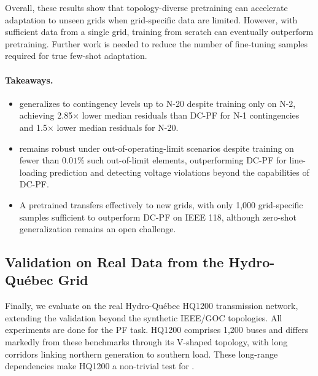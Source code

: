 Overall, these results show that topology-diverse pretraining can accelerate adaptation to unseen grids when grid-specific data are limited. However, with sufficient data from a single grid, training from scratch can eventually outperform pretraining. Further work is needed to reduce the number of fine-tuning samples required for true few-shot adaptation.\\




\begin{boxH}
\paragraph{Takeaways.}

\begin{itemize}

\item \genco generalizes to contingency levels up to N-20 despite training only on N-2, achieving 2.85$\times$ lower median residuals than DC-PF for N-1 contingencies and 1.5$\times$ lower median residuals for N-20.

\item \genco remains robust under out-of-operating-limit scenarios despite training on fewer than $0.01$\% such out-of-limit elements, outperforming DC-PF for line-loading prediction and detecting voltage violations beyond the capabilities of DC-PF.

\item A pretrained \genco transfers effectively to new grids, with only 1,000 grid-specific samples sufficient to outperform DC-PF on IEEE 118, although zero-shot generalization remains an open challenge.

\end{itemize}
\end{boxH}




\subsection{Validation on Real Data from the Hydro-Québec Grid}
\label{subsec:hq1200}

Finally, we evaluate \genco on the real Hydro-Qu\'ebec HQ1200 transmission network, extending the validation beyond the synthetic IEEE/GOC topologies. All experiments are done for the PF task. HQ1200 comprises 1,200 buses and differs markedly from these benchmarks through its V-shaped topology, with long corridors linking northern generation to southern load. These long-range dependencies make HQ1200 a non-trivial test for \genco.\\

